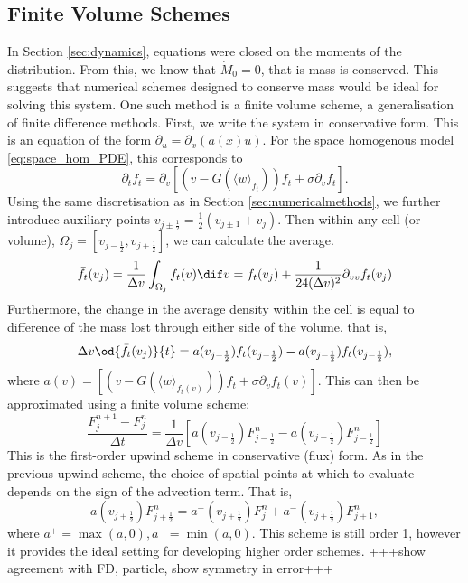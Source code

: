 \documentclass[11pt, a4paper, draft]{article}
\newcommand{\Dt}{\Delta t}
\newcommand{\Dv}{\Delta v}
\begin{document}
        \subsection{Finite Volume Schemes}
        In Section \ref{sec:dynamics}, equations were closed on the moments of the distribution. From this, we know that \(\dot{M}_0 = 0\), that is mass is conserved. This suggests that numerical schemes designed to conserve mass would be ideal for solving this system. One such method is a finite volume scheme, a generalisation of finite difference methods. First, we write the system in conservative form. This is an equation of the form $\partial_ u = \partial_x(a(x)u)$. For the space homogenous model \eqref{eq:space_hom_PDE}, this corresponds to
        \begin{equation}\label{eq:flux_space_hom}
        \partial_t f_t = \partial_v \left[\left(v-G(\langle w \rangle_{f_t})\right)f_t + \sigma \partial_v f_t \right].
        \end{equation}
        Using the same discretisation as in Section \ref{sec:numericalmethods}, we further introduce auxiliary points $v_{j\pm\frac{1}{2}} = \frac{1}{2}(v_{j\pm1} + v_j) $. Then within any cell (or volume), $\Omega_j = [v_{j-\frac{1}{2}}, v_{j+\frac{1}{2}}]$, we can calculate the average.
        \[
        \bar{f}_t(v_j) = \frac{1}{\Dv}\int_{\Omega_j} f_t(v) \dif v = f_t(v_j)+\frac{1}{24(\Dv)^2} \partial_{vv} f_t(v_j)
        \]
        Furthermore, the change in the average density within the cell is equal to difference of the mass lost through either side of the volume, that is,
        \[
        \Dv\od{\bar{f}_t(v_j)}{t} = a(v_{j-\frac{1}{2}})f_t(v_{j-\frac{1}{2}}) - a(v_{j-\frac{1}{2}})f_t(v_{j-\frac{1}{2}}), 
        \]
        where $a(v) = \left[\left(v-G(\langle w \rangle_{f_t(v)})\right)f_t + \sigma \partial_v f_t(v) \right]$. This can then be approximated using a finite volume scheme:
        \[
        \frac{F^{n+1}_j - F^n_j}{\Dt} = \frac{1}{\Dv}\left[ a(v_{j-\frac{1}{2}})F^n_{j-\frac{1}{2}} - a(v_{j-\frac{1}{2}})F^n_{j-\frac{1}{2}}\right]
        \]
        This is the first-order upwind scheme in conservative (flux) form. As in the previous upwind scheme, the choice of spatial points at which to evaluate depends on the sign of the advection term. That is,
        \[
        a(v_{j+\frac{1}{2}})F^n_{j+\frac{1}{2}} = a^+(v_{j+\frac{1}{2}})F^n_{j} + a^-(v_{j+\frac{1}{2}})F^n_{j+1},
        \]
        where $a^+ = \max(a,0), a^- = \min(a,0)$.  This scheme is still order 1, however it provides the ideal setting for developing higher order schemes.
        +++show agreement with FD, particle,  show symmetry in error+++ 
        
\end{document}
